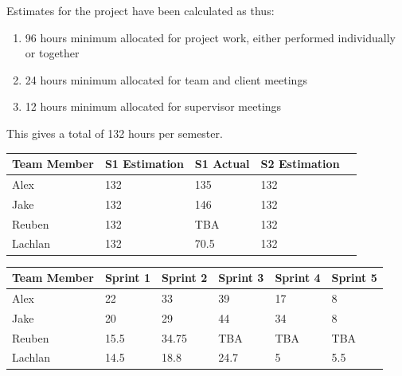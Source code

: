 \documentclass[12pt,a4paper,]{article}
\providecommand{\tightlist}{%
  \setlength{\itemsep}{0pt}\setlength{\parskip}{0pt}}
\begin{document}
Estimates for the project have been calculated as thus:

\begin{enumerate}
\def\labelenumi{\arabic{enumi}.}
\tightlist
\item
  96 hours minimum allocated for project work, either performed
  individually or together
\item
  24 hours minimum allocated for team and client meetings
\item
  12 hours minimum allocated for supervisor meetings
\end{enumerate}

This gives a total of 132 hours per semester.

\begin{longtable}[]{@{}lllll@{}}
\toprule
Team Member & S1 Estimation & S1 Actual & S2 Estimation\tabularnewline
\midrule
\endhead
Alex & 132 & 135 & 132\tabularnewline
Jake & 132 & 146 & 132\tabularnewline
Reuben & 132 & TBA & 132\tabularnewline
Lachlan & 132 & 70.5 & 132\tabularnewline
\bottomrule
\end{longtable}

\begin{longtable}[]{@{}llllll@{}}
\toprule
Team Member & Sprint 1 & Sprint 2 & Sprint 3 & Sprint 4 & Sprint
5\tabularnewline
\midrule
\endhead
Alex & 22 & 33 & 39 & 17 & 8\tabularnewline
Jake & 20 & 29 & 44 & 34 & 8\tabularnewline
Reuben & 15.5 & 34.75 & TBA & TBA & TBA\tabularnewline
Lachlan & 14.5 & 18.8 & 24.7 & 5 & 5.5\tabularnewline
\bottomrule
\end{longtable}
\end{document}
